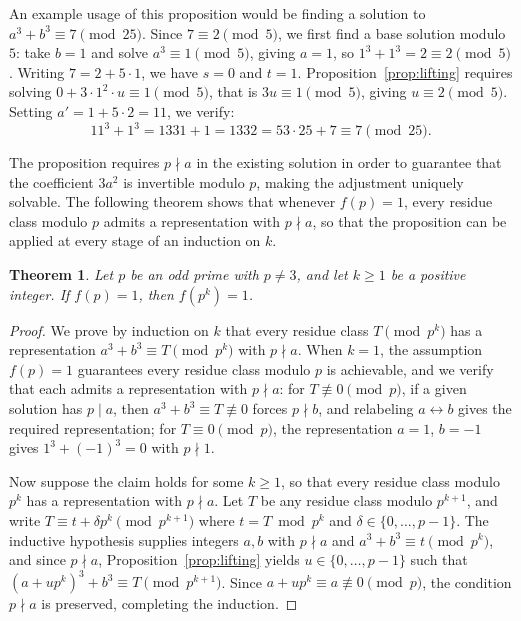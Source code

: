\documentclass[12pt]{amsart}
\newtheorem{theorem}{Theorem}
\theoremstyle{definition}
\theoremstyle{remark}
\begin{document}
An example usage of this proposition would be finding a solution to
$a^3 + b^3 \equiv 7 \pmod{25}$. Since $7 \equiv 2 \pmod{5}$, we first
find a base solution modulo $5$: take $b = 1$ and solve
$a^3 \equiv 1 \pmod{5}$, giving $a = 1$, so $1^3 + 1^3 = 2 \equiv 2
\pmod{5}$. Writing $7 = 2 + 5 \cdot 1$, we have $s = 0$ and $t = 1$.
Proposition~\ref{prop:lifting} requires solving
$0 + 3 \cdot 1^2 \cdot u \equiv 1 \pmod{5}$, that is $3u \equiv 1
\pmod{5}$, giving $u \equiv 2 \pmod{5}$. Setting $a' = 1 + 5 \cdot 2 =
11$, we verify:
\[
11^3 + 1^3 = 1331 + 1 = 1332 = 53 \cdot 25 + 7 \equiv 7 \pmod{25}.
\]

The proposition requires $p \nmid a$ in the existing solution in order 
to guarantee that the coefficient $3a^2$ is invertible modulo $p$, 
making the adjustment uniquely solvable. The following theorem shows 
that whenever $f(p) = 1$, every residue class modulo $p$ admits a 
representation with $p \nmid a$, so that the proposition can be applied 
at every stage of an induction on $k$. 

\begin{theorem}\label{thm:lifting-general}
Let $p$ be an odd prime with $p \ne 3$, and let $k \ge 1$ be a positive 
integer. If $f(p) = 1$, then $f(p^k) = 1$.
\end{theorem}
\begin{proof}
We prove by induction on $k$ that every residue class $T \pmod{p^k}$ 
has a representation $a^3 + b^3 \equiv T \pmod{p^k}$ with $p \nmid a$. When $k = 1$, the assumption $f(p) = 1$ guarantees every 
residue class modulo $p$ is achievable, and we verify that each admits 
a representation with $p \nmid a$: for $T \not\equiv 0 \pmod{p}$, if a 
given solution has $p \mid a$, then $a^3 + b^3 \equiv T \not\equiv 0$ 
forces $p \nmid b$, and relabeling $a \leftrightarrow b$ gives the 
required representation; for $T \equiv 0 \pmod{p}$, the representation 
$a = 1$, $b = -1$ gives $1^3 + (-1)^3 = 0$ with $p \nmid 1$.

Now suppose the claim holds for some $k \ge 1$, so that every residue 
class modulo $p^k$ has a representation with $p \nmid a$. Let $T$ be 
any residue class modulo $p^{k+1}$, and write 
$T \equiv t + \delta p^k \pmod{p^{k+1}}$ where $t = T \bmod p^k$ and 
$\delta \in \{0, \ldots, p-1\}$. The inductive hypothesis supplies 
integers $a, b$ with $p \nmid a$ and $a^3 + b^3 \equiv t \pmod{p^k}$, 
and since $p \nmid a$, Proposition~\ref{prop:lifting} yields 
$u \in \{0, \ldots, p-1\}$ such that 
$(a + up^k)^3 + b^3 \equiv T \pmod{p^{k+1}}$. Since 
$a + up^k \equiv a \not\equiv 0 \pmod{p}$, the condition $p \nmid a$ 
is preserved, completing the induction.
\end{proof}
\end{document}
